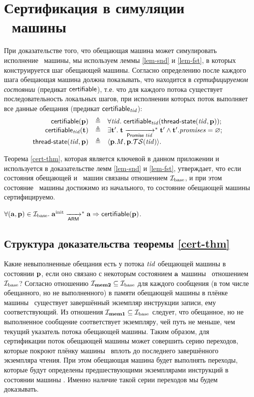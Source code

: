 \chapter{Сертификация в симуляции \ARMt~машины}
\label{sec:app:cert}

При доказательстве того, что обещающая машина может симулировать исполнение \ARMt~машины,
мы используем леммы \ref{lem-snd} и \ref{lem-fst}, в которых конструируется шаг обещающей машины.
Согласно определению после каждого шага обещающая машина должна показывать, что находится в \emph{сертифицируемом состоянии}
(предикат $\mathsf{certifiable}$), т.е. что для каждого потока существует последовательность
локальных шагов, при исполнении которых поток
выполняет все данные обещания (предикат $\mathsf{certifiable}_{\mathit{tid}}$):
\[\begin{array}{r l l}
\mathsf{certifiable}(\mathbf{p}) & \triangleq & \forall \mathit{tid}. \; \mathsf{certifiable}_{\mathit{tid}}(\textup{\sf thread-state}(\mathit{tid},\mathbf{p})); \\
\mathsf{certifiable}_{\mathit{tid}}(\mathbf{t}) & \triangleq & \exists \mathbf{t}'. \; \mathbf{t} \xrightarrow[\mathsf{Promise} \; \mathit{tid}]{}^{*} \mathbf{t}' \land \mathbf{t}'.\mathit{promises} = \varnothing; \\
\textup{\sf thread-state}(\mathit{tid}, \mathbf{p}) & \triangleq & \langle \mathbf{p}.\mathit{M}, \mathbf{p}.\mathcal{TS}(\mathit{tid}) \rangle. \\
\end{array}\]

Теорема \ref{cert-thm}, которая является ключевой в данном приложении и используется в доказательстве
лемм \ref{lem-snd} и \ref{lem-fst}, утверждает,
что если состояния обещающей и \ARMt~машин связаны отношением $\mathcal{I}_{\textup{\rm base}}$, и при этом состояние \ARMt~машины
достижимо из начального, то состояние обещающей машины сертифицируемо.
\begin{theorem}
\label{cert-thm}
$\forall (\mathbf{a}, \mathbf{p}) \in \mathcal{I}_{\textup{\rm base}}. \; \mathbf{a}^{\rm init} \xrightarrow[\mathsf{ARM}]{}^{*} \mathbf{a} \Rightarrow \mathsf{certifiable}(\mathbf{p})$.
\end{theorem}

\section{Структура доказательства теоремы \ref{cert-thm}}

Какие невыполненные обещания есть у потока $\mathit{tid}$ обещающей машины в состоянии $\mathbf{p}$,
если оно связано с некоторым состоянием $\mathbf{a}$ машины \ARMt~отношением $\mathcal{I}_{\textup{\rm base}}$?
Согласно отношению $\mathcal{I}_{\rm \bf mem2} \subseteq \mathcal{I}_{\textup{\rm base}}$ для каждого сообщения
(в том числе обещанного, но не выполненного) в памяти обещающей машины
в плёнке машины \ARMt~существует завершённый экземпляр инструкции записи, ему
соответствующий. Из отношения $\mathcal{I}_{\rm \bf mem1} \subseteq \mathcal{I}_{\textup{\rm base}}$ следует, что
обещанное, но не выполненное сообщение соответствует экземпляру, чей путь не меньше,
чем текущий указатель потока обещающей машины.
Таким образом, для сертификации поток обещающей машины может совершить серию переходов,
которые покроют плёнку машины \ARMt~вплоть до последнего завершённого экземпляра чтения.
При этом обещающая машина будет выполнять переходы, которые будут определены предшествующими
экземплярами инструкций в состоянии машины \ARMt.
Именно наличие такой серии переходов мы будем доказывать.

